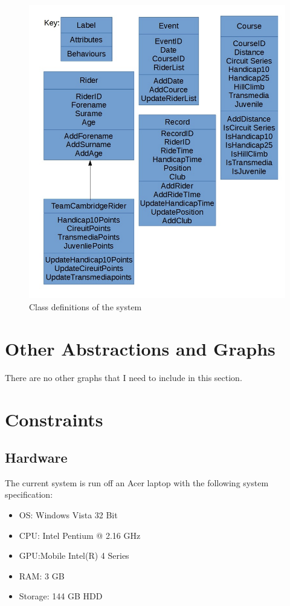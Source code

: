 \begin{figure}[H]
	\includegraphics[width=\textwidth]{./Class.jpg}

	\caption{Class definitions of the system}
\end{figure}
\section{Other Abstractions and Graphs}
There are no other graphs that I need to include in this section.
\section{Constraints}

\subsection{Hardware}

The current system is run off an Acer laptop with the following system specification:

\begin{itemize}
\item OS: Windows Vista 32 Bit
\item CPU: Intel Pentium @ 2.16 GHz
\item GPU:Mobile Intel(R) 4 Series 
\item RAM: 3 GB
\item Storage: 144 GB HDD
\end{itemize}

